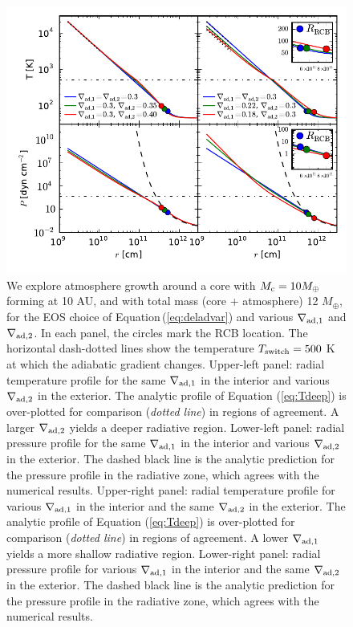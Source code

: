 \documentclass[apj]{emulateapj}
\newcommand{\Eq}[1]{Equation\,(\ref{#1})}
\newcommand{\co}{_{\rm c}}
\begin{document}
\begin{figure}[tb]
\centering
\includegraphics[width=\textwidth]{../../figs/ModelAtmospheres/RadSelfGravRealEOS/PaperFigs/varying_delad_4panel_3.pdf}
\caption{We explore atmosphere growth around a core with $M\co=10 M_{\oplus}$ forming at 10 AU, and with total mass (core + atmosphere) 12 $M_{\oplus}$, for the EOS choice of \Eq{eq:deladvar} and various $\nabla_{\rm ad,1}$ and $\nabla_{\rm ad,2}$. In each panel, the circles mark the RCB location. The horizontal dash-dotted lines show the temperature $T_{\rm switch}=500$ K at which the adiabatic gradient changes. Upper-left panel: radial temperature profile for the same $\nabla_{\rm ad,1}$ in the interior and various $\nabla_{\rm ad,2}$ in the exterior. The analytic profile of Equation (\ref{eq:Tdeep}) is over-plotted for comparison (\textit{dotted line}) in regions of agreement. A larger $\nabla_{\rm ad,2}$ yields a deeper radiative region.  Lower-left panel: radial pressure profile for the same $\nabla_{\rm ad,1}$ in the interior and various $\nabla_{\rm ad,2}$ in the exterior. The dashed black line is the analytic prediction for the pressure profile in the radiative zone, which agrees with the numerical results. Upper-right panel: radial temperature profile for various $\nabla_{\rm ad,1}$ in the interior and the same $\nabla_{\rm ad,2}$ in the exterior. The analytic profile of Equation (\ref{eq:Tdeep}) is over-plotted for comparison (\textit{dotted line}) in regions of agreement. A lower $\nabla_{\rm ad,1}$ yields a more shallow radiative region. Lower-right panel: radial pressure profile for various $\nabla_{\rm ad,1}$ in the interior and the same $\nabla_{\rm ad,2}$ in the exterior. The dashed black line is the analytic prediction for the pressure profile in the radiative zone, which agrees with the numerical results.}
\label{fig:varying_delad}
\end{figure}
\end{document}
